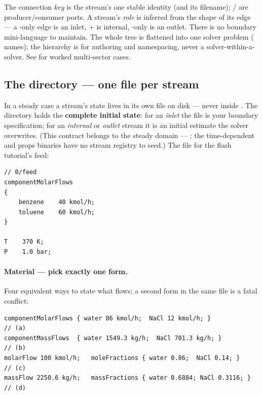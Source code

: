 \documentclass[11pt,a4paper]{article}
\begin{document}
The connection \emph{key} is the stream's one stable identity (and its
 filename); / are producer/consumer ports.
A stream's \emph{role} is inferred from the shape of its edge --- a
-only edge is an inlet, + is internal,
-only is an outlet.  There is no boundary mini-language to
maintain.  The whole tree is flattened into one solver problem
( names); the hierarchy is for authoring and
namespacing, never a solver-within-a-solver.  See
 for worked multi-sector cases.

\subsection{The  directory --- one file per stream}\label{sec:zero}

In a steady case a stream's state lives in its own file on disk ---
never inside .  The  directory holds the
\textbf{complete initial state}: for an \emph{inlet} the file is your
boundary specification; for an \emph{internal} or \emph{outlet} stream
it is an initial estimate the solver overwrites.  (This contract
belongs to the steady domain --- ; the time-dependent
and props binaries have no stream registry to seed.)  The file for the
flash tutorial's feed:

\begin{lstlisting}[language=dict]
// 0/feed
componentMolarFlows
{
    benzene    40 kmol/h;
    toluene    60 kmol/h;
}

T    370 K;
P    1.0 bar;
\end{lstlisting}

\paragraph{Material --- pick exactly one form.}  Four equivalent ways to
state what flows; a second form in the same file is a fatal conflict:

\begin{lstlisting}[language=dict]
componentMolarFlows { water 86 kmol/h;  NaCl 12 kmol/h; }             // (a)
componentMassFlows  { water 1549.3 kg/h;  NaCl 701.3 kg/h; }          // (b)
molarFlow 100 kmol/h;   moleFractions { water 0.86;  NaCl 0.14; }     // (c)
massFlow 2250.6 kg/h;   massFractions { water 0.6884; NaCl 0.3116; }  // (d)
\end{lstlisting}
\end{document}
